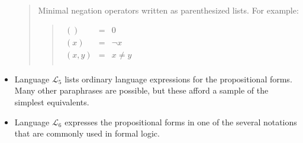 \documentclass[12pt]{article}
\begin{document}
\begin{itemize}
\begin{quote}
Minimal negation operators written as parenthesized lists.  For example:

\begin{quote}$\begin{array}{ccc}
( )    & = & 0       \\
(x)    & = & \lnot x \\
(x, y) & = & x \ne y \\
\end{array}$\end{quote}
\end{quote}

\item
Language $\mathcal{L}_5$ lists ordinary language expressions for the propositional forms.  Many other paraphrases are possible, but these afford a sample of the simplest equivalents.

\item
Language $\mathcal{L}_6$ expresses the propositional forms in one of the several notations that are commonly used in formal logic.

\end{itemize}

\end{document}
